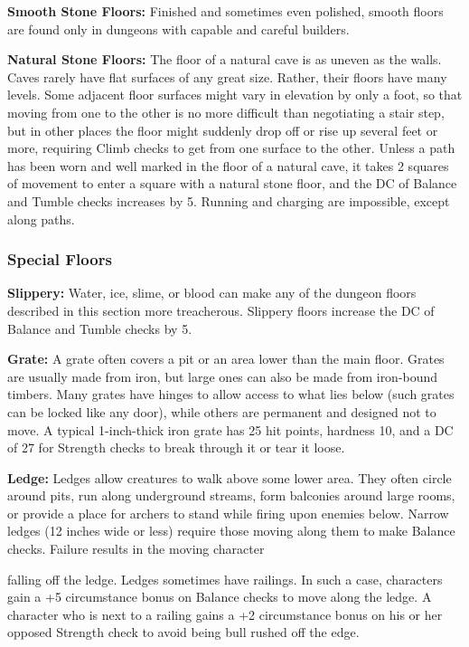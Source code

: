 \textbf{Smooth Stone Floors:} Finished and sometimes even polished, smooth floors 
are found only in dungeons with capable and careful builders. 

\textbf{Natural Stone Floors:} The floor of a natural cave is as uneven as the 
walls. Caves rarely have flat surfaces of any great size. Rather, their floors 
have many levels. Some adjacent floor surfaces might vary in elevation by only 
a foot, so that moving from one to the other is no more difficult than negotiating 
a stair step, but in other places the floor might suddenly drop off or rise up 
several feet or more, requiring Climb checks to get from one surface to the other. 
Unless a path has been worn and well marked in the floor of a natural cave, it 
takes 2 squares of movement to enter a square with a natural stone floor, and the 
DC of Balance and Tumble checks increases by 5. Running and charging are impossible, 
except along paths.

\subsubsection{Special Floors}

\textbf{Slippery:} Water, ice, slime, or blood can make any of the dungeon floors 
described in this section more treacherous. Slippery floors increase the DC of 
Balance and Tumble checks by 5. 

\textbf{Grate:} A grate often covers a pit or an area lower than the main floor. 
Grates are usually made from iron, but large ones can also be made from iron-bound 
timbers. Many grates have hinges to allow access to what lies below (such grates 
can be locked like any door), while others are permanent and designed not to move. 
A typical 1-inch-thick iron grate has 25 hit points, hardness 10, and a DC of 27 
for Strength checks to break through it or tear it loose.

\textbf{Ledge:} Ledges allow creatures to walk above some lower area. They often 
circle around pits, run along underground streams, form balconies around large 
rooms, or provide a place for archers to stand while firing upon enemies below. 
Narrow ledges (12 inches wide or less) require those moving along them to make 
Balance checks. Failure results in the moving character

falling off the ledge. Ledges sometimes have railings. In such a case, characters 
gain a +5 circumstance bonus on Balance checks to move along the ledge. A character 
who is next to a railing gains a +2 circumstance bonus on his or her opposed Strength 
check to avoid being bull rushed off the edge.

